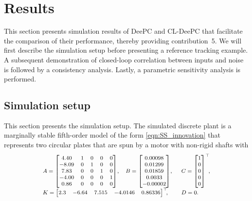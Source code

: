 \section{Results}\label{sec:results}
\noindent This section presents simulation results of \ac{DeePC} and \ac{CL-DeePC} that facilitate the comparison of their performance, thereby providing contribution~5. We will first describe the simulation setup before presenting a reference tracking example. A subsequent demonstration of closed-loop correlation between inputs and noise is followed by a consistency analysis. Lastly, a parametric sensitivity analysis is performed.
\subsection{Simulation setup}\label{sec:simulation_setup}
\noindent This section presents the simulation setup. The simulated discrete plant is a marginally stable fifth-order 
model of the form \eqref{eqn:SS_innovation} that represents two circular plates that are spun by a motor with non-rigid shafts with \citep{Favoreel1999b}
\begin{align}\label{eq:SysFavoreel}
\scriptsize
\begin{array}{lll}
    A = \begin{bmatrix}
        4.40 & 1 & 0 & 0 & 0\\
       -8.09 & 0 & 1 & 0 & 0\\
        7.83 & 0 & 0 & 1 & 0\\
       -4.00 & 0 & 0 & 0 & 1\\
        0.86 & 0 & 0 & 0 & 0
    \end{bmatrix}\!,&
    B = \begin{bmatrix}
        0.00098\\
        0.01299\\
        0.01859\\
        0.0033\\
       -0.00002
    \end{bmatrix}\!,&C = \begin{bmatrix}
        1 \\ 0 \\ 0\\ 0\\ 0
    \end{bmatrix}^\top\mkern-7mu,\\
    K = \begin{bmatrix}
        2.3 & -6.64 & 7.515 & -4.0146 & 0.86336
    \end{bmatrix}^\top\mkern-7mu,\span
    &D=0.
\end{array}
\end{align}

